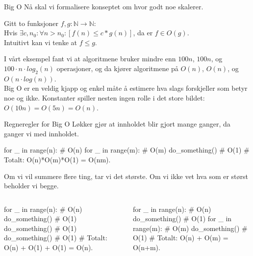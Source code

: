 \begin{frame}{Big O}
    Nå skal vi formalisere konseptet om hvor godt noe skalerer.
    \begin{definition}[Big O]
        Gitt to funksjoner $f, g : \mathbb{N} \rightarrow \mathbb{N}$: \\
        Hvis $\exists c, n_0 : \forall n > n_0 : [ f(n) \leq c*g(n) ]$, da er $f \in O(g)$.\\
        Intuitivt kan vi tenke at $f \leq g$.
    \end{definition}
    \pause
    I vårt eksempel fant vi at algoritmene bruker mindre enn $100n$, $100n$, og $100 \cdot n \cdot log_2(n)$ operasjoner, og da kjører algoritmene på $O(n)$, $O(n)$, og $O(n \cdot log(n))$.\\[2mm]
    Big O er en veldig kjapp og enkel måte å estimere hva slags forskjeller som betyr noe og ikke. Konstanter spiller nesten ingen rolle i det store bildet: $O(10n) = O(5n) = O(n)$.
\end{frame}

\begin{frame}[fragile]{Regneregler for Big O}
    Løkker gjør at innholdet blir gjort mange ganger, da ganger vi med innholdet.
    \begin{python}
for _ in range(n):     # O(n)
    for _ in range(m): # O(m)
        do_something() # O(1)
# Totalt: O(n)*O(m)*O(1) = O(nm).
    \end{python}
    \pause
    Om vi vil summere flere ting, tar vi det største. Om vi ikke vet hva som er størst beholder vi begge.  
    \begin{columns}
        \begin{column}{0.5\textwidth}
            \begin{python}
for _ in range(n): # O(n)
    do_something() # O(1)
do_something()     # O(1)
do_something()     # O(1)
# Totalt: O(n) + O(1) + O(1) = O(n).  
            \end{python}
        \end{column}
        \pause
        \begin{column}{0.45\textwidth}
            \begin{python}
for _ in range(n): # O(n)
    do_something() # O(1)
for _ in range(m): # O(m)
    do_something() # O(1)
# Totalt: O(n) + O(m) = O(n+m).
            \end{python}
        \end{column}
    \end{columns}
\end{frame}